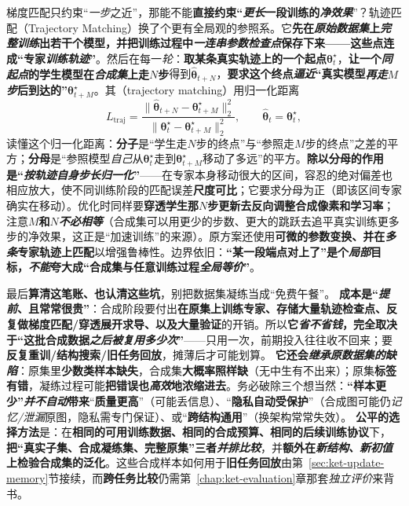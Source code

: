 梯度匹配只约束“\emph{一步}之近”，那能不能\textbf{直接约束“\emph{更长}一段训练的\emph{净效果}}”？轨迹匹配（Trajectory Matching）换了个更有全局观的参照系。它\textbf{先在\emph{原始数据集}上\emph{完整训练}出若干个模型，并把训练过程中\emph{一连串\emph{参数检查点}}保存下来——这些点连成“专家\emph{训练轨迹}”}。然后在每一\emph{轮}：\textbf{取某条真实轨迹上的一个起点}$\bm{\theta}_t^\star$，\textbf{让一个\emph{同起点}的学生模型在\emph{合成集}上走$N$步}得到$\widehat{\bm{\theta}}_{t+N}$，\textbf{要求这个终点\emph{逼近}“真实模型\emph{再走$M$步}后到达的”}$\bm{\theta}_{t+M}^\star$。其（trajectory matching）用归一化距离
\begin{equation}
  L_{\mathrm{traj}}
  =\frac{\lVert\widehat{\bm\theta}_{t+N}
                   -\bm\theta_{t+M}^\star\rVert_2^2}
         {\lVert\bm\theta_t^\star
                   -\bm\theta_{t+M}^\star\rVert_2^2},
  \qquad
  \widehat{\bm\theta}_t=\bm\theta_t^\star,
  \label{eq:ka-condensation-trajectory-matching}
\end{equation}
读懂这个归一化距离：\textbf{分子}是“学生走$N$步的终点”与“参照走$M$步的终点”之差的平方；\textbf{分母}是“参照模型\emph{自己}从$\bm{\theta}_t^\star$走到$\bm{\theta}_{t+M}^\star$移动了多远”的平方。\textbf{除以分母的作用是“\emph{按轨迹\emph{自身步长}归一化}”}——在专家本身移动很大的区间，容忍的绝对偏差也相应放大，使不同训练阶段的匹配误差\textbf{尺度可比}；它要求分母为正（即该区间专家确实在移动）。优化时同样要\textbf{穿透学生那$N$步更新去反向调整合成像素和学习率}；注意\textbf{$M$和$N$\emph{不必相等}}（合成集可以用更少的步数、更大的跳跃去追平真实训练更多步的净效果，这正是“加速训练”的来源）。原方案还使用\textbf{可微的参数变换、并在\emph{多条}专家轨迹上匹配}以增强鲁棒性。边界依旧：\textbf{“某一段端点对上了”是个\emph{局部}目标，\emph{不能}夸大成“合成集与任意训练过程\emph{全局等价}”}。

最后\textbf{算清这笔账、也认清这些坑}，别把数据集凝练当成“免费午餐”。
\textbf{成本是“\emph{提前}、且常常很贵”}：合成阶段要付出\textbf{在原集上训练专家、存储大量轨迹检查点、反复做梯度匹配/穿透展开求导、以及大量验证}的开销。所以\textbf{它\emph{省不省钱}，完全取决于“这批合成数据\emph{之后被\emph{复用}多少次}”}——只用一次，前期投入往往收不回来；要\textbf{反复重训/结构搜索/旧任务回放}，摊薄后才可能划算。
\textbf{它还会\emph{继承原数据集的缺陷}}：原集里\textbf{少数类样本缺失}，合成集\textbf{大概率照样缺}（无中生有不出来）；原集\textbf{标签有错}，凝练过程可能\textbf{把错误也\emph{高效}地浓缩进去}。务必破除三个想当然：\textbf{“样本更少”\emph{并不自动}带来}“\textbf{质量更高}”（可能丢信息）、“\textbf{隐私自动受保护}”（合成图可能仍\emph{记忆/泄漏}原图，隐私需专门保证）、或“\textbf{跨结构通用}”（换架构常常失效）。
\textbf{公平的选择方法}是：在\textbf{相同的可用训练数据、相同的合成预算、相同的后续训练协议}下，\textbf{把“真实子集、合成凝练集、完整原集”三者\emph{并排比较}}，并\textbf{额外在\emph{新结构、新初值}上检验合成集的泛化}。这些合成样本如何用于\textbf{旧任务回放}由第~\ref{sec:ket-update-memory}节接续，而\textbf{跨任务比较}仍需第~\ref{chap:ket-evaluation}章那套\emph{独立评价}来背书。

